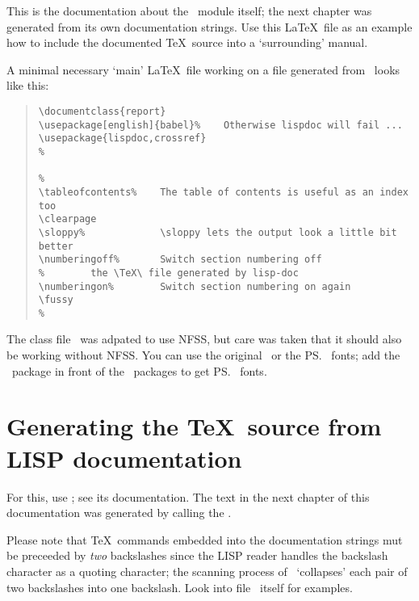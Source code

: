 %
\par{}This is the documentation about the \ module
itself; the next chapter was generated from its own documentation
strings. Use this \LaTeX\ file as an example how to include the
documented \TeX\ source into a `surrounding' manual.
%
\par{}A minimal necessary `main' \LaTeX\ file working on a file
generated from \ looks like this:
%
\begin{quote}\begin{verbatim}
\documentclass{report}
\usepackage[english]{babel}%    Otherwise lispdoc will fail ...
\usepackage{lispdoc,crossref}
%

%
\tableofcontents%    The table of contents is useful as an index too
\clearpage
\sloppy%             \sloppy lets the output look a little bit better
\numberingoff%       Switch section numbering off
%        the \TeX\ file generated by lisp-doc
\numberingon%        Switch section numbering on again
\fussy
%

\end{verbatim}\end{quote}
%
\par{}The class file \ was adpated to use NFSS, but
care was taken that it should also be working without NFSS. You can
use the original \ or the \ps\ fonts; add the
\ package in front of the \ packages to get
\ps\ fonts.
%
\section{Generating the \protect\TeX\ source from LISP documentation}
\label{sec:gentex}
%
For this, use ; see its documentation.
The text in the next chapter of this documentation was generated by
calling the .
%
\par{}Please note that \TeX\ commands embedded into the documentation
strings mut be preceeded by {\sl two} backslashes since the LISP
reader handles the backslash character as a quoting character;
the scanning process of \ `collapses' each pair of two
backslashes into one backslash. Look into file
\ itself for examples.
%
